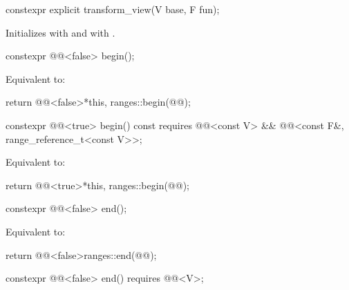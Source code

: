 %
\begin{itemdecl}
constexpr explicit transform_view(V base, F fun);
\end{itemdecl}

\begin{itemdescr}
\pnum
\effects
Initializes  with  and
 with .
\end{itemdescr}

%
\begin{itemdecl}
constexpr @@<false> begin();
\end{itemdecl}

\begin{itemdescr}
\pnum
\effects
Equivalent to:
\begin{codeblock}
return @@<false>{*this, ranges::begin(@@)};
\end{codeblock}
\end{itemdescr}

%
\begin{itemdecl}
constexpr @@<true> begin() const
  requires @@<const V> &&
           @@<const F&, range_reference_t<const V>>;
\end{itemdecl}

\begin{itemdescr}
\pnum
\effects
Equivalent to:
\begin{codeblock}
return @@<true>{*this, ranges::begin(@@)};
\end{codeblock}
\end{itemdescr}

%
\begin{itemdecl}
constexpr @@<false> end();
\end{itemdecl}

\begin{itemdescr}
\pnum
\effects
Equivalent to:
\begin{codeblock}
return @@<false>{ranges::end(@@)};
\end{codeblock}
\end{itemdescr}

%
\begin{itemdecl}
constexpr @@<false> end() requires @@<V>;
\end{itemdecl}


